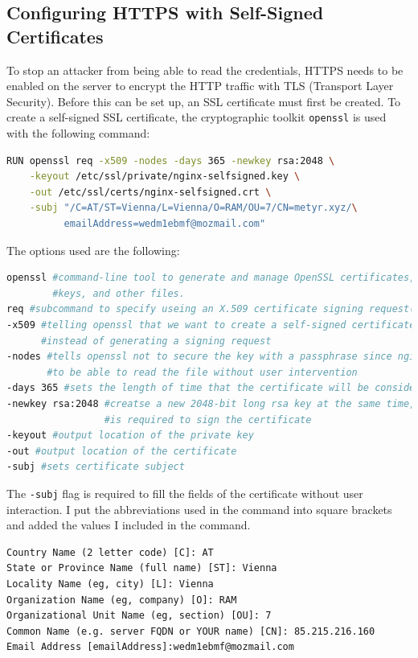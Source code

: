 \documentclass[a4paper]{article}
\begin{document}
\subsection{Configuring HTTPS with Self-Signed Certificates}
To stop an attacker from being able to read the credentials, HTTPS needs to be enabled on the server to encrypt the HTTP traffic with TLS (Transport Layer Security). Before this can be set up, an SSL certificate must first be created.
To create a self-signed SSL certificate, the cryptographic toolkit \texttt{openssl} is used with the following command:\cite{self-signed-ssl,non-interactive-ssl-gen}
\begin{lstlisting}[language=bash]
RUN openssl req -x509 -nodes -days 365 -newkey rsa:2048 \
    -keyout /etc/ssl/private/nginx-selfsigned.key \
    -out /etc/ssl/certs/nginx-selfsigned.crt \
    -subj "/C=AT/ST=Vienna/L=Vienna/O=RAM/OU=7/CN=metyr.xyz/\
          emailAddress=wedm1ebmf@mozmail.com"
\end{lstlisting}
The options used are the following:
\begin{lstlisting}[language=bash]
openssl #command-line tool to generate and manage OpenSSL certificates,
        #keys, and other files.
req #subcommand to specify useing an X.509 certificate signing request(CSR)
-x509 #telling openssl that we want to create a self-signed certificate
      #instead of generating a signing request
-nodes #tells openssl not to secure the key with a passphrase since nginx needs
       #to be able to read the file without user intervention
-days 365 #sets the length of time that the certificate will be considered valid
-newkey rsa:2048 #creatse a new 2048-bit long rsa key at the same time, which 
                 #is required to sign the certificate
-keyout #output location of the private key
-out #output location of the certificate
-subj #sets certificate subject
\end{lstlisting}
The \texttt{-subj} flag is required to fill the fields of the certificate without user interaction. I put the abbreviations used in the command into square brackets and added the values I included in the command.
\begin{lstlisting}
Country Name (2 letter code) [C]: AT
State or Province Name (full name) [ST]: Vienna
Locality Name (eg, city) [L]: Vienna
Organization Name (eg, company) [O]: RAM
Organizational Unit Name (eg, section) [OU]: 7
Common Name (e.g. server FQDN or YOUR name) [CN]: 85.215.216.160
Email Address [emailAddress]:wedm1ebmf@mozmail.com
\end{lstlisting}
\end{document}
